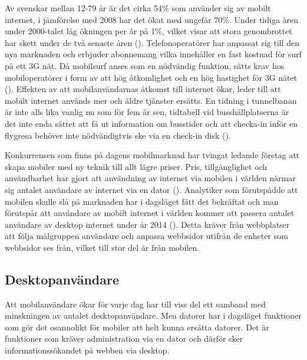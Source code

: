 \documentclass[11pt]{article}
\begin{document}
Av svenskar mellan 12-79 år är det cirka 54\% som använder sig av mobilt internet, i jämförelse med 2008 har det ökat med ungefär 70\%. Under tidiga åren under 2000-talet låg ökningen per år på 1\%, vilket visar att stora genombrottet har skett under de två senaste åren (\cite[s. 24]{.se}). Telefonoperatörer har anpassat sig till den nya marknaden och erbjuder abonnemang vilka innehåller en fast kostnad för surf på ett 3G nät. Då mobilsurf anses som en nödvändig funktion, sätts krav hos mobiloperatörer i form av att hög åtkomlighet och en hög hastighet för 3G nätet (\cite[s. 17]{Cfigroup_2009}). Effekten av att mobilanvändarnas åtkomst till internet ökar, leder till att mobilt internet används mer och äldre tjänster ersätts. En tidning i tunnelbanan är inte alls lika vanlig nu som för fem år sen, tidtabell vid busshållplatserna är det inte enda sättet att få ut information om busstider och att checka-in inför en flygresa behöver inte nödvändigtvis ske via en check-in disk (\cite{kpcb}).

Konkurrensen som finns på dagens mobilmarknad har tvingat ledande företag att skapa mobiler med ny teknik till allt lägre priser. Pris, tillgänglighet och användbarhet har gjort att användning av internet via mobilen i världen närmar sig antalet användare av internet via en dator (\cite{morganstanley}). Analytiker som förutspådde att mobilen skulle slå på marknaden har i dagsläget fått det bekräftat och man förutspår att användare av mobilt internet i världen kommer att passera antalet användare av desktop internet under år 2014 (\cite{morganstanley}). Detta kräver från webbplatser att följa målgruppen användare och anpassa webbsidor utifrån de enheter som webbsidor ses från, vilket till stor del är från mobilen.

\subsection{Desktopanvändare}
Att mobilanvändare ökar för varje dag har till viss del ett samband med minskningen av antalet desktopanvändare. Men datorer har i dagsläget funktioner som gör det osannolikt för mobiler att helt kunna ersätta datorer. Det är funktioner som kräver administration via en dator och därför sker informationssökandet på webben via desktop. 
\end{document}
